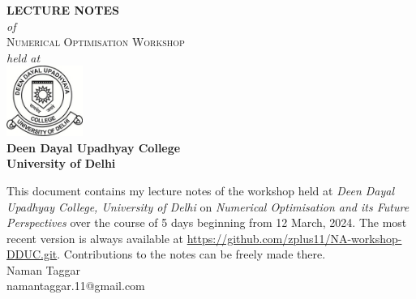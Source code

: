 \begin{titlepage}
	\begin{center}
		{\huge\bfseries LECTURE NOTES} \\
		\vfill
		{\large\itshape of} \\[1cm]
		{\huge\scshape Numerical Optimisation Workshop} \\
		\vfill
		{\large\itshape held at} \\[1cm]
		\includegraphics[width = 2.5cm]{assets/dduheader.png} \\[10pt]
		{\Large\bfseries Deen Dayal Upadhyay College} \\[5pt]
		{\large\bfseries University of Delhi}
	\end{center}
\end{titlepage}

This document contains my lecture notes of the workshop held at
{\itshape Deen Dayal Upadhyay College, University of Delhi}
on
{\itshape Numerical Optimisation and its Future Perspectives}
over the course of 5 days beginning from 12 March, 2024. The most recent version is always available at \url{https://github.com/zplus11/NA-workshop-DDUC.git}. Contributions to the notes can be freely made there. \\[\baselineskip]

\noindent
Naman Taggar \\
{\ttfamily namantaggar.11@gmail.com}

\restoregeometry